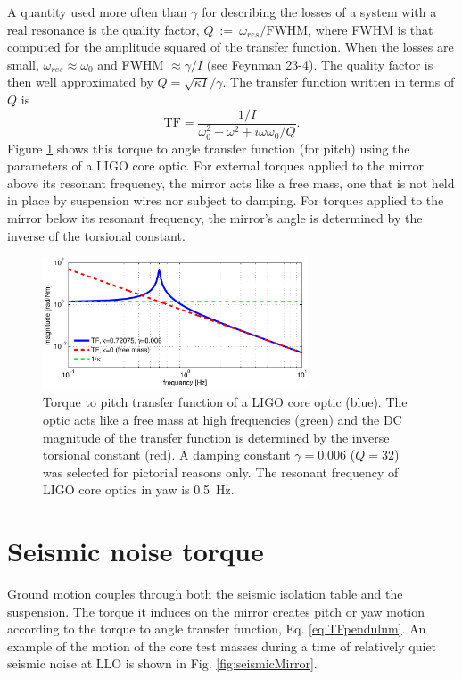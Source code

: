A quantity used more often than $\gamma$ for describing the losses of
a system with a real resonance is the quality factor,
$Q~:=~\omega_{res}/\mathrm{FWHM}$, where FWHM is that computed for the
amplitude squared of the transfer function. When the losses are small,
$\omega_{res} \approx \omega_0$ and FWHM $\approx \gamma/I$ (see
Feynman 23-4). The quality factor is then well approximated by $Q =
\sqrt{\kappa I}/\gamma$. The transfer function written in terms of $Q$
is
\begin{equation}
\mathrm{TF} = \frac{1/I}{\omega_0^2  - \omega^2 + i \omega \omega_0 / Q}.
\label{eq:TFpendulum}
\end{equation}
Figure \ref{fig:pendTF} shows this torque to angle transfer function
(for pitch) using the parameters of a LIGO core optic. For external
torques applied to the mirror above its resonant frequency, the mirror
acts like a free mass, one that is not held in place by suspension
wires nor subject to damping. For torques applied to the mirror below
its resonant frequency, the mirror's angle is determined by the
inverse of the torsional constant.

\begin{figure}
\begin{centering}
\includegraphics[width=0.7\textwidth]{figures/pendTF.pdf}
\caption{Torque to pitch transfer function of a LIGO core optic
  (blue). The optic acts like a free mass at high frequencies (green)
  and the DC magnitude of the transfer function is determined by the
  inverse torsional constant (red). A damping constant $\gamma =
  0.006$ ($Q=32$) was selected for pictorial reasons only. The
  resonant frequency of LIGO core optics in yaw is 0.5~Hz.}
\label{fig:pendTF}
\end{centering}
\end{figure}




\section{Seismic noise torque}
Ground motion couples through both the seismic isolation table and the
suspension. The torque it induces on the mirror creates pitch or yaw
motion according to the torque to angle transfer function,
Eq. \ref{eq:TFpendulum}. An example of the motion of the core test
masses during a time of relatively quiet seismic noise at LLO is shown
in Fig. \ref{fig:seismicMirror}.


